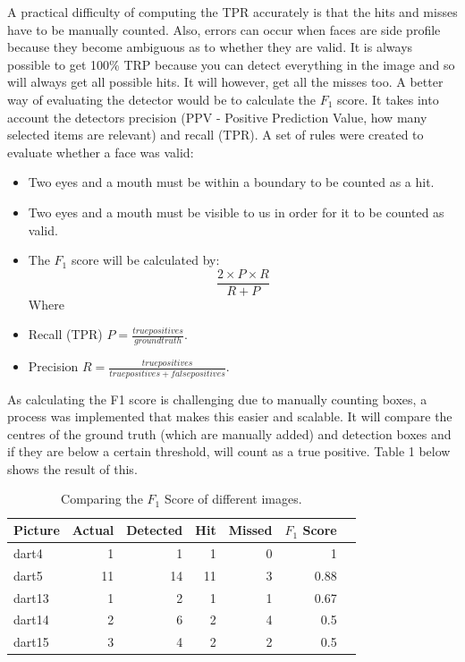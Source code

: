 \documentclass[a4paper]{article}
\begin{document}
A practical difficulty of computing the TPR accurately is that the hits and
misses have to be manually counted. Also, errors can occur when faces are side
profile because they become ambiguous as to whether they are valid. It is
always possible to get 100\% TRP because you can detect everything in the image
and so will always get all possible hits. It will however, get all the misses
too. A better way of evaluating the detector would be to calculate the
\(F_{1}\) score. It takes into account the detectors precision (PPV - Positive
Prediction Value, how many selected items are relevant) and recall (TPR). A set
of rules were created to evaluate whether a face was valid:


\begin{itemize}
  \item Two eyes and a mouth must be within a boundary to be counted as a hit.
  \item Two eyes and a mouth must be visible to us in order for it to be
    counted as valid.
  \item The \(F_{1}\) score will be calculated by: \[\frac{2 \times P \times
    R}{R + P}\] Where
  \item Recall (TPR) ${P = \frac{true positives}{ground truth}}$.
  \item Precision ${R = \frac{true positives}{true positives + false
    positives}}$.
\end{itemize}

As calculating the F1 score is challenging due to manually counting boxes, a process was implemented that makes this easier and scalable. It will compare the centres of the ground truth (which are manually added) and detection boxes and if they are below a certain threshold, will count as a true positive. Table 1 below shows the result of this.

\begin{table} [H]
\centering
\begin{tabular}{l| r | r | r | r | r | r}
Picture & Actual & Detected & Hit & Missed & \(F_{1}\) Score \\\hline
dart4 & 1 & 1 & 1 & 0 & 1\\
dart5 & 11 & 14 & 11 & 3 & 0.88 \\
dart13 & 1 & 2 & 1 & 1 & 0.67 \\
dart14 & 2 & 6 & 2 & 4 & 0.5 \\
dart15 & 3 & 4 & 2 & 2 & 0.5
\end{tabular}
\caption{\label{tab:F1}Comparing the \(F_{1}\) Score of different images.}
\end{table}
\end{document}

